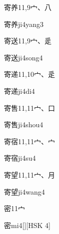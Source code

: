 \begin{entry}{寄养}{11,9}{⼧、⼋}
  \begin{phonetics}{寄养}{ji4yang3}
  \end{phonetics}
\end{entry}

\begin{entry}{寄送}{11,9}{⼧、⾡}
  \begin{phonetics}{寄送}{ji4song4}
  \end{phonetics}
\end{entry}

\begin{entry}{寄递}{11,10}{⼧、⾡}
  \begin{phonetics}{寄递}{ji4di4}
  \end{phonetics}
\end{entry}

\begin{entry}{寄售}{11,11}{⼧、⼝}
  \begin{phonetics}{寄售}{ji4shou4}
  \end{phonetics}
\end{entry}

\begin{entry}{寄宿}{11,11}{⼧、⼧}
  \begin{phonetics}{寄宿}{ji4su4}
  \end{phonetics}
\end{entry}

\begin{entry}{寄望}{11,11}{⼧、⽉}
  \begin{phonetics}{寄望}{ji4wang4}
  \end{phonetics}
\end{entry}

\begin{entry}{密}{11}{⼧}
  \begin{phonetics}{密}{mi4}[][HSK 4]
  \end{phonetics}
\end{entry}


